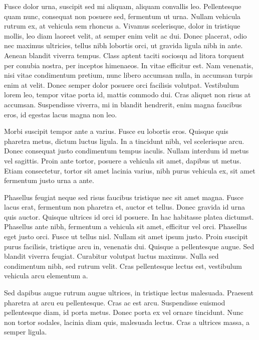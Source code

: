 \documentclass[target=bach,aauheader=,style=]{thud}
\begin{document}
Fusce dolor urna, suscipit sed mi aliquam, aliquam convallis leo. Pellentesque quam nunc, consequat non posuere sed, fermentum ut urna. Nullam vehicula rutrum ex, at vehicula sem rhoncus a. Vivamus scelerisque, dolor in tristique mollis, leo diam laoreet velit, at semper enim velit ac dui. Donec placerat, odio nec maximus ultricies, tellus nibh lobortis orci, ut gravida ligula nibh in ante. Aenean blandit viverra tempus. Class aptent taciti sociosqu ad litora torquent per conubia nostra, per inceptos himenaeos. In vitae efficitur est. Nam venenatis, nisi vitae condimentum pretium, nunc libero accumsan nulla, in accumsan turpis enim at velit. Donec semper dolor posuere orci facilisis volutpat. Vestibulum lorem leo, tempor vitae porta id, mattis commodo dui. Cras aliquet non risus at accumsan. Suspendisse viverra, mi in blandit hendrerit, enim magna faucibus eros, id egestas lacus magna non leo.

Morbi suscipit tempor ante a varius. Fusce eu lobortis eros. Quisque quis pharetra metus, dictum luctus ligula. In a tincidunt nibh, vel scelerisque arcu. Donec consequat justo condimentum tempus iaculis. Nullam interdum id metus vel sagittis. Proin ante tortor, posuere a vehicula sit amet, dapibus ut metus. Etiam consectetur, tortor sit amet lacinia varius, nibh purus vehicula ex, sit amet fermentum justo urna a ante.

Phasellus feugiat neque sed risus faucibus tristique nec sit amet magna. Fusce lacus erat, fermentum non pharetra et, auctor et tellus. Donec gravida id urna quis auctor. Quisque ultrices id orci id posuere. In hac habitasse platea dictumst. Phasellus ante nibh, fermentum a vehicula sit amet, efficitur vel orci. Phasellus eget justo orci. Fusce ut tellus nisl. Nullam sit amet ipsum justo. Proin suscipit purus facilisis, tristique arcu in, venenatis dui. Quisque a pellentesque augue. Sed blandit viverra feugiat. Curabitur volutpat luctus maximus. Nulla sed condimentum nibh, sed rutrum velit. Cras pellentesque lectus est, vestibulum vehicula arcu elementum a.

Sed dapibus augue rutrum augue ultrices, in tristique lectus malesuada. Praesent pharetra at arcu eu pellentesque. Cras ac est arcu. Suspendisse euismod pellentesque diam, id porta metus. Donec porta ex vel ornare tincidunt. Nunc non tortor sodales, lacinia diam quis, malesuada lectus. Cras a ultrices massa, a semper ligula.




\appendix
\end{document}
